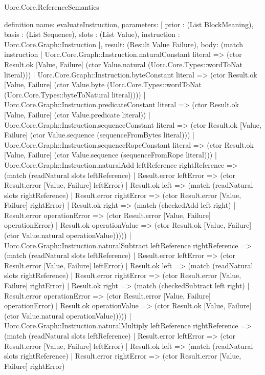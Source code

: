 \begin{lexlean}{Uorc.Core.ReferenceSemantics}
\begin{semanticmodule}
definition{
  name: evaluateInstruction,
  parameters: [
    prior : (List BlockMeaning),
    basis : (List Sequence),
    slots : (List Value),
    instruction : Uorc.Core.Graph::Instruction
  ],
  result: (Result Value Failure),
  body: (match instruction
    | Uorc.Core.Graph::Instruction.naturalConstant literal => (ctor Result.ok [Value, Failure] (ctor Value.natural (Uorc.Core.Types::wordToNat literal)))
    | Uorc.Core.Graph::Instruction.byteConstant literal => (ctor Result.ok [Value, Failure] (ctor Value.byte (Uorc.Core.Types::wordToNat (Uorc.Core.Types::byteToNatural literal))))
    | Uorc.Core.Graph::Instruction.predicateConstant literal => (ctor Result.ok [Value, Failure] (ctor Value.predicate literal))
    | Uorc.Core.Graph::Instruction.sequenceConstant literal => (ctor Result.ok [Value, Failure] (ctor Value.sequence (sequenceFromBytes literal)))
    | Uorc.Core.Graph::Instruction.sequenceRopeConstant literal => (ctor Result.ok [Value, Failure] (ctor Value.sequence (sequenceFromRope literal)))
    | Uorc.Core.Graph::Instruction.naturalAdd leftReference rightReference => (match (readNatural slots leftReference)
      | Result.error leftError => (ctor Result.error [Value, Failure] leftError)
      | Result.ok left => (match (readNatural slots rightReference)
        | Result.error rightError => (ctor Result.error [Value, Failure] rightError)
        | Result.ok right => (match (checkedAdd left right)
          | Result.error operationError => (ctor Result.error [Value, Failure] operationError)
          | Result.ok operationValue => (ctor Result.ok [Value, Failure] (ctor Value.natural operationValue)))))
    | Uorc.Core.Graph::Instruction.naturalSubtract leftReference rightReference => (match (readNatural slots leftReference)
      | Result.error leftError => (ctor Result.error [Value, Failure] leftError)
      | Result.ok left => (match (readNatural slots rightReference)
        | Result.error rightError => (ctor Result.error [Value, Failure] rightError)
        | Result.ok right => (match (checkedSubtract left right)
          | Result.error operationError => (ctor Result.error [Value, Failure] operationError)
          | Result.ok operationValue => (ctor Result.ok [Value, Failure] (ctor Value.natural operationValue)))))
    | Uorc.Core.Graph::Instruction.naturalMultiply leftReference rightReference => (match (readNatural slots leftReference)
      | Result.error leftError => (ctor Result.error [Value, Failure] leftError)
      | Result.ok left => (match (readNatural slots rightReference)
        | Result.error rightError => (ctor Result.error [Value, Failure] rightError)
}
\end{semanticmodule}
\end{lexlean}
